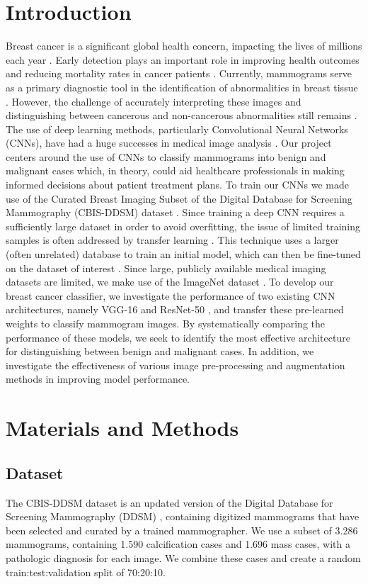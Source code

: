 \documentclass[sn-mathphys,Numbered]{sn-jnl}%
\theoremstyle{thmstyleone}%
\theoremstyle{thmstyletwo}%
\theoremstyle{thmstylethree}%
\begin{document}
\section{Introduction}
\label{Introduction}
Breast cancer is a significant global health concern, impacting the lives of millions each year \cite{siegel2023cancer}. Early detection plays an important role in improving health outcomes and reducing mortality rates in cancer patients \cite{Mathew2018}. Currently, mammograms serve as a primary diagnostic tool in the identification of abnormalities in breast tissue \cite{Mathew2018}. However, the challenge of accurately interpreting these images and distinguishing between cancerous and non-cancerous abnormalities still remains \cite{elter2009}. The use of deep learning methods, particularly Convolutional Neural Networks (CNNs), have had a huge successes in medical image analysis \cite{Cai2020-hn}. Our project centers around the use of CNNs to classify mammograms into benign and malignant cases which, in theory, could aid healthcare professionals in making informed decisions about patient treatment plans. To train our CNNs we made use of the Curated Breast Imaging Subset of the Digital Database for Screening Mammography (CBIS-DDSM) dataset \cite{Lee2017-hi}. Since training a deep CNN requires a sufficiently large dataset in order to avoid overfitting, the issue of limited training samples is often addressed by transfer learning \cite{Kim2022-ge}. This technique uses a larger (often unrelated) database to train an initial model, which can then be fine-tuned on the dataset of interest \cite{Kim2022-ge}. Since large, publicly available medical imaging datasets are limited, we make use of the ImageNet dataset \cite{Deng2009-vj}. To develop our breast cancer classifier, we investigate the performance of two existing CNN architectures, namely VGG-16 \cite{simonyan2015deep} and ResNet-50 \cite{he2015deep}, and transfer these pre-learned weights to classify mammogram images. By systematically comparing the performance of these models, we seek to identify the most effective architecture for distinguishing between benign and malignant cases. In addition, we investigate the effectiveness of various image pre-processing and augmentation methods in improving model performance.
\section{Materials and Methods}
\label{Materials}
\subsection{Dataset}
\label{Dataset}
The CBIS-DDSM dataset is an updated version of the Digital Database for Screening Mammography (DDSM) \cite{Heath2007THEDD}, containing digitized mammograms that have been selected and curated by a trained mammographer. We use a subset of 3.286 mammograms, containing 1.590 calcification cases and 1.696 mass cases, with a pathologic diagnosis for each image. We combine these cases and create a random train:test:validation split of 70:20:10.
\end{document}
